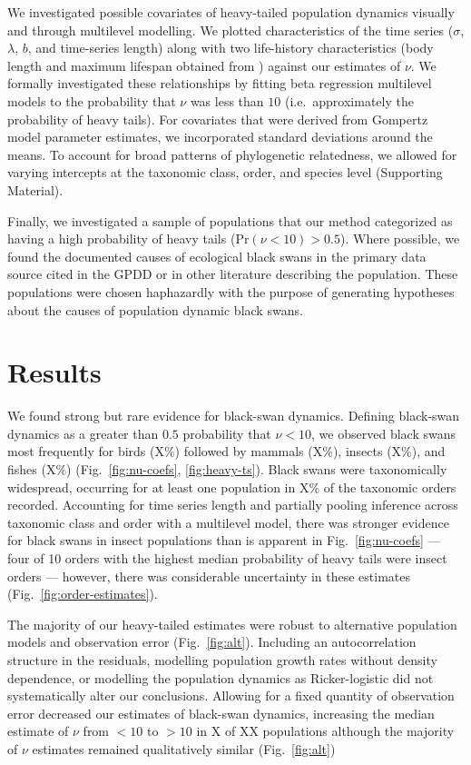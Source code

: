 We investigated possible covariates of heavy-tailed population dynamics
visually and through multilevel modelling. We plotted characteristics of the
time series ($\sigma$, $\lambda$, $b$, and time-series length) along with two
life-history characteristics (body length and maximum lifespan obtained from
\citet{brook2006a}) against our estimates of $\nu$. We formally investigated
these relationships by fitting beta regression multilevel models to the
probability that $\nu$ was less than $10$ (i.e.~approximately the probability
of heavy tails). For covariates that were derived from Gompertz model parameter
estimates, we incorporated standard deviations around the means. To account for
broad patterns of phylogenetic relatedness, we allowed for varying intercepts
at the taxonomic class, order, and species level (Supporting Material).

Finally, we investigated a sample of populations that our method categorized as
having a high probability of heavy tails (Pr$(\nu < 10) > 0.5$). Where
possible, we found the documented causes of ecological black swans in the
primary data source cited in the GPDD or in other literature describing the
population. These populations were chosen haphazardly with the purpose of
generating hypotheses about the causes of population dynamic black swans.

\section{Results}

We found strong but rare evidence for black-swan dynamics. Defining black-swan
dynamics as a greater than $0.5$ probability that $\nu < 10$, we observed black
swans most frequently for birds (X\%) followed by mammals (X\%), insects (X\%),
and fishes (X\%) (Fig.~\ref{fig:nu-coefs}, \ref{fig:heavy-ts}). Black swans
were taxonomically widespread, occurring for at least one population in X\% of
the taxonomic orders recorded. Accounting for time series length and partially
pooling inference across taxonomic class and order with a multilevel model,
there was stronger evidence for black swans in insect populations than is
apparent in Fig.~\ref{fig:nu-coefs} --- four of 10 orders with the highest
median probability of heavy tails were insect orders --- however, there was
considerable uncertainty in these estimates (Fig.~\ref{fig:order-estimates}).

The majority of our heavy-tailed estimates were robust to alternative
population models and observation error (Fig.~\ref{fig:alt}). Including an
autocorrelation structure in the residuals, modelling population growth rates
without density dependence, or modelling the population dynamics as
Ricker-logistic did not systematically alter our conclusions. Allowing for
a fixed quantity of observation error decreased our estimates of black-swan
dynamics, increasing the median estimate of $\nu$ from $<10$ to $>10$ in X of
XX populations although the majority of $\nu$ estimates remained qualitatively
similar (Fig.~\ref{fig:alt})

